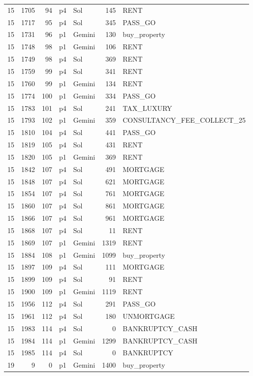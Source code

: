 \begin{longtable}{r r r l l r >{\ttfamily}l}
15 & 1705 & 94 & p4 & Sol & 145 & RENT \\
15 & 1717 & 95 & p4 & Sol & 345 & PASS\_GO \\
15 & 1731 & 96 & p1 & Gemini & 130 & buy\_property \\
15 & 1748 & 98 & p1 & Gemini & 106 & RENT \\
15 & 1749 & 98 & p4 & Sol & 369 & RENT \\
15 & 1759 & 99 & p4 & Sol & 341 & RENT \\
15 & 1760 & 99 & p1 & Gemini & 134 & RENT \\
15 & 1774 & 100 & p1 & Gemini & 334 & PASS\_GO \\
15 & 1783 & 101 & p4 & Sol & 241 & TAX\_LUXURY \\
15 & 1793 & 102 & p1 & Gemini & 359 & CONSULTANCY\_FEE\_COLLECT\_25 \\
15 & 1810 & 104 & p4 & Sol & 441 & PASS\_GO \\
15 & 1819 & 105 & p4 & Sol & 431 & RENT \\
15 & 1820 & 105 & p1 & Gemini & 369 & RENT \\
15 & 1842 & 107 & p4 & Sol & 491 & MORTGAGE \\
15 & 1848 & 107 & p4 & Sol & 621 & MORTGAGE \\
15 & 1854 & 107 & p4 & Sol & 761 & MORTGAGE \\
15 & 1860 & 107 & p4 & Sol & 861 & MORTGAGE \\
15 & 1866 & 107 & p4 & Sol & 961 & MORTGAGE \\
15 & 1868 & 107 & p4 & Sol & 11 & RENT \\
15 & 1869 & 107 & p1 & Gemini & 1319 & RENT \\
15 & 1884 & 108 & p1 & Gemini & 1099 & buy\_property \\
15 & 1897 & 109 & p4 & Sol & 111 & MORTGAGE \\
15 & 1899 & 109 & p4 & Sol & 91 & RENT \\
15 & 1900 & 109 & p1 & Gemini & 1119 & RENT \\
15 & 1956 & 112 & p4 & Sol & 291 & PASS\_GO \\
15 & 1961 & 112 & p4 & Sol & 180 & UNMORTGAGE \\
15 & 1983 & 114 & p4 & Sol & 0 & BANKRUPTCY\_CASH \\
15 & 1984 & 114 & p1 & Gemini & 1299 & BANKRUPTCY\_CASH \\
15 & 1985 & 114 & p4 & Sol & 0 & BANKRUPTCY \\
19 & 9 & 0 & p1 & Gemini & 1400 & buy\_property \\

\end{longtable}
